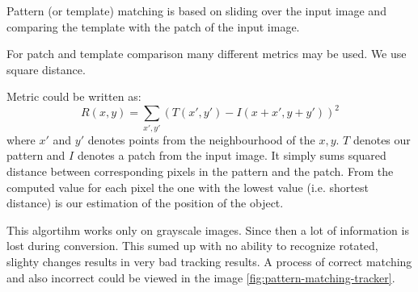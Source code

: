 Pattern (or template) matching is based on sliding over the input image and
comparing the template with the patch of the input image.

For patch and template comparison many different metrics may be used. We use 
square distance.

Metric could be written as:
$$
R(x, y) = 
\sum_{x', y'} (T(x', y') - I(x + x', y + y'))^2
$$
where $x'$ and $y'$ denotes points from the neighbourhood of the $x, y$. $T$
denotes our pattern and $I$ denotes a patch from the input image. It simply
sums squared distance between corresponding pixels in the pattern and the
patch. From the computed value for each pixel the one with the lowest value
(i.e. shortest distance) is our estimation of the position of the object.

This algortihm works only on grayscale images. Since then a lot of information
is lost during conversion. This sumed up with no ability to recognize rotated,
slighty changes results in very bad tracking results. A process of correct
matching and also incorrect could be viewed in the image
\ref{fig:pattern-matching-tracker}.

